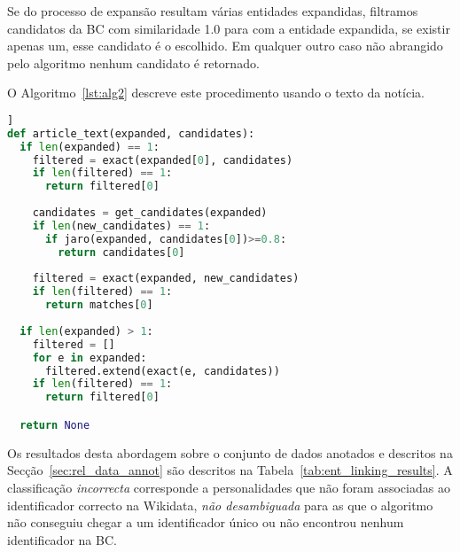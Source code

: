 \documentclass[a4paper, twocolumn, 11pt, twoside]{article}
\begin{document}
Se do processo de expansão resultam várias entidades expandidas, filtramos candidatos da BC com similaridade 1.0 para com a entidade expandida, se existir apenas um, esse candidato é o escolhido. Em qualquer outro caso não abrangido pelo algoritmo nenhum candidato é retornado. 

O Algoritmo~\ref{lst:alg2} descreve este procedimento usando o texto da notícia.

\begin{lstlisting}[language=python,columns=fullflexible,frame=single,label={lst:alg2},title={Algoritmo 6.2. Ligação com a Wikidata usando o texto da notícia para expandir as entidades reconhecidas no título.},captionpos=b]]
def article_text(expanded, candidates):
  if len(expanded) == 1:
    filtered = exact(expanded[0], candidates)
	if len(filtered) == 1:
	  return filtered[0]
	  
    candidates = get_candidates(expanded)
    if len(new_candidates) == 1:
      if jaro(expanded, candidates[0])>=0.8:
        return candidates[0]
 
    filtered = exact(expanded, new_candidates)
    if len(filtered) == 1:
      return matches[0]
  
  if len(expanded) > 1:
    filtered = []
    for e in expanded:
      filtered.extend(exact(e, candidates))
    if len(filtered) == 1:
      return filtered[0]

  return None
\end{lstlisting}


\begin{comment}

\begin{lstlisting}[language=python,columns=fullflexible,label={lst:alg3},caption=News text approach.]]

def entity_linking(per):
    candidates = get_candidates(ent)
    wiki_id = title_only(per, candidates)
    if not wiki_id:
        expanded = expand(per, news_text)
        wiki_id = article_text(candidates, expanded)
    return wiki_id
\end{lstlisting}

\end{comment}


Os resultados desta abordagem sobre o conjunto de dados anotados e descritos na Secção~\ref{sec:rel_data_annot} são descritos na Tabela~\ref{tab:ent_linking_results}. A classificação \textit{incorrecta} corresponde a personalidades que não foram associadas ao identificador correcto na Wikidata, \textit{não desambiguada} para as que o algoritmo não conseguiu chegar a um identificador único ou não encontrou nenhum identificador na BC.
\end{document}
